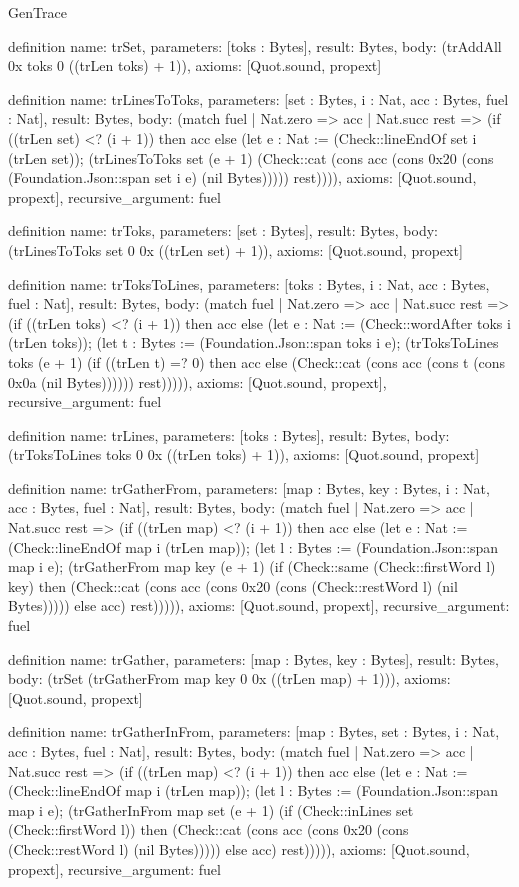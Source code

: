 \begin{lexlean}{GenTrace}
\begin{semanticmodule}
definition{
  name: trSet,
  parameters: [toks : Bytes],
  result: Bytes,
  body: (trAddAll 0x toks 0 ((trLen toks) + 1)),
  axioms: [Quot.sound, propext]
}

definition{
  name: trLinesToToks,
  parameters: [set : Bytes, i : Nat, acc : Bytes, fuel : Nat],
  result: Bytes,
  body: (match fuel
    | Nat.zero => acc
    | Nat.succ rest => (if ((trLen set) <? (i + 1)) then acc else (let e : Nat := (Check::lineEndOf set i (trLen set)); (trLinesToToks set (e + 1) (Check::cat (cons acc (cons 0x20 (cons (Foundation.Json::span set i e) (nil Bytes))))) rest)))),
  axioms: [Quot.sound, propext],
  recursive_argument: fuel
}

definition{
  name: trToks,
  parameters: [set : Bytes],
  result: Bytes,
  body: (trLinesToToks set 0 0x ((trLen set) + 1)),
  axioms: [Quot.sound, propext]
}

definition{
  name: trToksToLines,
  parameters: [toks : Bytes, i : Nat, acc : Bytes, fuel : Nat],
  result: Bytes,
  body: (match fuel
    | Nat.zero => acc
    | Nat.succ rest => (if ((trLen toks) <? (i + 1)) then acc else (let e : Nat := (Check::wordAfter toks i (trLen toks)); (let t : Bytes := (Foundation.Json::span toks i e); (trToksToLines toks (e + 1) (if ((trLen t) =? 0) then acc else (Check::cat (cons acc (cons t (cons 0x0a (nil Bytes)))))) rest))))),
  axioms: [Quot.sound, propext],
  recursive_argument: fuel
}

definition{
  name: trLines,
  parameters: [toks : Bytes],
  result: Bytes,
  body: (trToksToLines toks 0 0x ((trLen toks) + 1)),
  axioms: [Quot.sound, propext]
}

definition{
  name: trGatherFrom,
  parameters: [map : Bytes, key : Bytes, i : Nat, acc : Bytes, fuel : Nat],
  result: Bytes,
  body: (match fuel
    | Nat.zero => acc
    | Nat.succ rest => (if ((trLen map) <? (i + 1)) then acc else (let e : Nat := (Check::lineEndOf map i (trLen map)); (let l : Bytes := (Foundation.Json::span map i e); (trGatherFrom map key (e + 1) (if (Check::same (Check::firstWord l) key) then (Check::cat (cons acc (cons 0x20 (cons (Check::restWord l) (nil Bytes))))) else acc) rest))))),
  axioms: [Quot.sound, propext],
  recursive_argument: fuel
}

definition{
  name: trGather,
  parameters: [map : Bytes, key : Bytes],
  result: Bytes,
  body: (trSet (trGatherFrom map key 0 0x ((trLen map) + 1))),
  axioms: [Quot.sound, propext]
}

definition{
  name: trGatherInFrom,
  parameters: [map : Bytes, set : Bytes, i : Nat, acc : Bytes, fuel : Nat],
  result: Bytes,
  body: (match fuel
    | Nat.zero => acc
    | Nat.succ rest => (if ((trLen map) <? (i + 1)) then acc else (let e : Nat := (Check::lineEndOf map i (trLen map)); (let l : Bytes := (Foundation.Json::span map i e); (trGatherInFrom map set (e + 1) (if (Check::inLines set (Check::firstWord l)) then (Check::cat (cons acc (cons 0x20 (cons (Check::restWord l) (nil Bytes))))) else acc) rest))))),
  axioms: [Quot.sound, propext],
  recursive_argument: fuel
}


\end{semanticmodule}
\end{lexlean}
